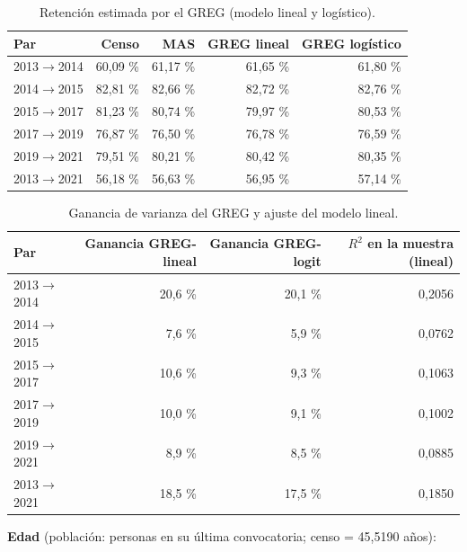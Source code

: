 \begin{table}[H]
  \centering
  \small
  \caption{Retención estimada por el GREG (modelo lineal y logístico).}
  \label{tab:mues-greg-retencion}
  \begin{tabular}{@{}lrrrr@{}}
    \toprule
    \textbf{Par} & \textbf{Censo} & \textbf{MAS} & \textbf{GREG lineal}
      & \textbf{GREG logístico} \\
    \midrule
    2013$\rightarrow$2014 & 60,09 \% & 61,17 \% & 61,65 \% & 61,80 \% \\
    2014$\rightarrow$2015 & 82,81 \% & 82,66 \% & 82,72 \% & 82,76 \% \\
    2015$\rightarrow$2017 & 81,23 \% & 80,74 \% & 79,97 \% & 80,53 \% \\
    2017$\rightarrow$2019 & 76,87 \% & 76,50 \% & 76,78 \% & 76,59 \% \\
    2019$\rightarrow$2021 & 79,51 \% & 80,21 \% & 80,42 \% & 80,35 \% \\
    2013$\rightarrow$2021 & 56,18 \% & 56,63 \% & 56,95 \% & 57,14 \% \\
    \bottomrule
  \end{tabular}
\end{table}

\begin{table}[H]
  \centering
  \small
  \caption{Ganancia de varianza del GREG y ajuste del modelo lineal.}
  \label{tab:mues-greg-ganancia}
  \begin{tabular}{@{}lrrr@{}}
    \toprule
    \textbf{Par} & \textbf{Ganancia GREG-lineal} & \textbf{Ganancia GREG-logit}
      & \textbf{$R^2$ en la muestra (lineal)} \\
    \midrule
    2013$\rightarrow$2014 & 20,6 \% & 20,1 \% & 0,2056 \\
    2014$\rightarrow$2015 & 7,6 \% & 5,9 \% & 0,0762 \\
    2015$\rightarrow$2017 & 10,6 \% & 9,3 \% & 0,1063 \\
    2017$\rightarrow$2019 & 10,0 \% & 9,1 \% & 0,1002 \\
    2019$\rightarrow$2021 & 8,9 \% & 8,5 \% & 0,0885 \\
    2013$\rightarrow$2021 & 18,5 \% & 17,5 \% & 0,1850 \\
    \bottomrule
  \end{tabular}
\end{table}

\textbf{Edad} (población: personas en su última convocatoria; censo = 45,5190
años):

